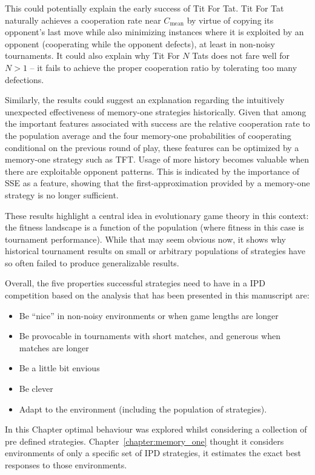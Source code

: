 This could potentially explain the early success of Tit For Tat. Tit For Tat naturally achieves
a cooperation rate near $C_{\text{mean}}$ by virtue of copying its opponent's
last move while also minimizing instances where it is exploited by an opponent
(cooperating while the opponent defects), at least in non-noisy tournaments. It
could also explain why Tit For \(N\) Tats does not fare well for $N > 1$ -- it
fails to achieve the proper cooperation ratio by tolerating too many defections.

Similarly, the results could suggest an explanation regarding the intuitively
unexpected effectiveness of memory-one strategies historically. Given that among
the important features associated with success are the relative cooperation rate
to the population average and the four memory-one probabilities of cooperating
conditional on the previous round of play, these features can be optimized by a
memory-one strategy such as TFT. Usage of more history becomes valuable when
there are exploitable opponent patterns. This is indicated by the importance of
SSE as a feature, showing that the first-approximation provided by a memory-one
strategy is no longer sufficient.

These results highlight a central idea in evolutionary game theory in this
context: the fitness landscape is a function of the population (where fitness in
this case is tournament performance). While that may seem obvious now, it shows
why historical tournament results on small or arbitrary populations of
strategies have so often failed to produce generalizable results.

Overall, the five properties successful strategies need to have in a IPD competition
based on the analysis that has been presented in this manuscript are:

\begin{itemize}
    \item Be ``nice'' in non-noisy environments or when game lengths are longer
    \item Be provocable in tournaments with short matches, and generous when matches are longer
    \item Be a little bit envious
    \item Be clever
    \item Adapt to the environment (including the population of strategies).
\end{itemize}

In this Chapter optimal behaviour was explored whilst considering a collection
of pre defined strategies. Chapter~\ref{chapter:memory_one} thought it considers
environments of only a specific set of IPD strategies, it estimates the exact
best responses to those environments.